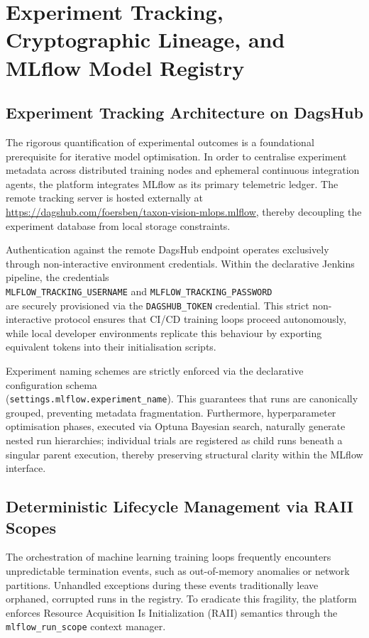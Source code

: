 \chapter{Experiment Tracking, Cryptographic Lineage, and MLflow Model Registry}
\label{ch:mlflow_tracking_and_registry}

\section{Experiment Tracking Architecture on DagsHub}
\label{sec:dagshub_experiment_tracking}
The rigorous quantification of experimental outcomes is a foundational prerequisite for iterative model optimisation. In order to centralise experiment metadata across distributed training nodes and ephemeral continuous integration agents, the platform integrates MLflow as its primary telemetric ledger. The remote tracking server is hosted externally at\\\url{https://dagshub.com/foersben/taxon-vision-mlops.mlflow}, thereby decoupling the experiment database from local storage constraints.

Authentication against the remote DagsHub endpoint operates exclusively through non-interactive environment credentials. Within the declarative Jenkins pipeline, the credentials\\\texttt{MLFLOW\_TRACKING\_USERNAME} and \texttt{MLFLOW\_TRACKING\_PASSWORD}\\are securely provisioned via the \texttt{DAGSHUB\_TOKEN} credential. This strict non-interactive protocol ensures that CI/CD training loops proceed autonomously, while local developer environments replicate this behaviour by exporting equivalent tokens into their initialisation scripts.

Experiment naming schemes are strictly enforced via the declarative configuration schema\\(\texttt{settings.mlflow.experiment\_name}). This guarantees that runs are canonically grouped, preventing metadata fragmentation. Furthermore, hyperparameter optimisation phases, executed via Optuna Bayesian search, naturally generate nested run hierarchies; individual trials are registered as child runs beneath a singular parent execution, thereby preserving structural clarity within the MLflow interface.

\section{Deterministic Lifecycle Management via RAII Scopes}
\label{sec:raii_lifecycle_management}
The orchestration of machine learning training loops frequently encounters unpredictable termination events, such as out-of-memory anomalies or network partitions. Unhandled exceptions during these events traditionally leave orphaned, corrupted runs in the registry. To eradicate this fragility, the platform enforces Resource Acquisition Is Initialization (RAII) semantics through the \texttt{mlflow\_run\_scope} context manager.

